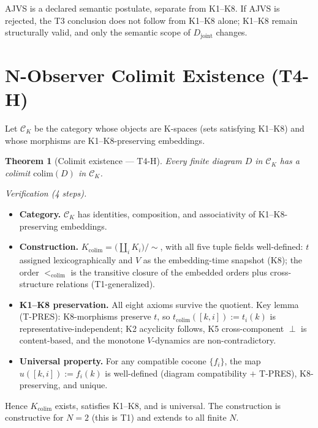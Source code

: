 \documentclass[12pt,a4paper]{article}
\theoremstyle{plain}
\newtheorem{theorem}{Theorem}[section]
\theoremstyle{definition}
\theoremstyle{remark}
\begin{document}
\noindent AJVS is a declared semantic postulate, separate from K1--K8. If AJVS
is rejected, the T3 conclusion does not follow from K1--K8 alone; K1--K8 remain
structurally valid, and only the semantic scope of $D_{\mathrm{joint}}$ changes.

\section{N-Observer Colimit Existence (T4-H)}
\label{app:T4H}

Let $\mathcal{C}_K$ be the category whose objects are K-spaces (sets satisfying
K1--K8) and whose morphisms are K1--K8-preserving embeddings.

\begin{theorem}[Colimit existence --- T4-H]\label{thm:T4H}
Every finite diagram $D$ in $\mathcal{C}_K$ has a colimit $\mathrm{colim}(D)$
in $\mathcal{C}_K$.
\end{theorem}

\noindent\emph{Verification (4 steps).}
\begin{itemize}[topsep=2pt]
  \item[\textbf{S1}] \textbf{Category.} $\mathcal{C}_K$ has identities,
        composition, and associativity of K1--K8-preserving embeddings.
  \item[\textbf{S2}] \textbf{Construction.}
        $K_{\mathrm{colim}} = \bigl(\coprod_i K_i\bigr)/\!\sim$, with all five
        tuple fields well-defined: $t$ assigned lexicographically and $V$ as the
        embedding-time snapshot (K8); the order $<_{\mathrm{colim}}$ is the
        transitive closure of the embedded orders plus cross-structure relations
        (T1-generalized).
  \item[\textbf{S3}] \textbf{K1--K8 preservation.} All eight axioms survive the
        quotient. Key lemma (T-PRES): K8-morphisms preserve $t$, so
        $t_{\mathrm{colim}}([k,i]) := t_i(k)$ is representative-independent;
        K2 acyclicity follows, K5 cross-component $\perp$ is content-based, and
        the monotone $V$-dynamics are non-contradictory.
  \item[\textbf{S4}] \textbf{Universal property.} For any compatible cocone
        $\{f_i\}$, the map $u([k,i]) := f_i(k)$ is well-defined (diagram
        compatibility $+$ T-PRES), K8-preserving, and unique.
\end{itemize}
Hence $K_{\mathrm{colim}}$ exists, satisfies K1--K8, and is universal. The
construction is constructive for $N=2$ (this is T1) and extends to all finite
$N$.
\end{document}

